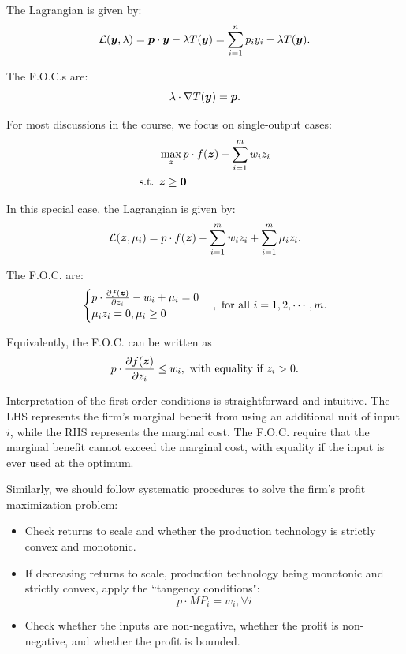 \noindent The Lagrangian is given by:
\[\mathcal L(\bm y,\lambda) = \bm p\cdot \bm y-\lambda T(\bm y) = \sum_{i = 1}^n p_iy_i-\lambda T(\bm y).\]

The F.O.C.s are:
\[\lambda\cdot  \nabla T(\bm y) = \bm p.\]

\noindent For most discussions in the course, we focus on single-output cases:
\[\begin{aligned}
& \max_{z} p\cdot f(\bm z)-\sum_{i = 1}^m w_iz_i\\
\text{s.t. }& \bm z\ge \textbf 0
\end{aligned}\]

In this special case, the Lagrangian is given by:
\[\mathcal L(\bm z,\mu_i) = p\cdot f(\bm z)-\sum_{i = 1}^m w_iz_i + \sum_{i = 1}^m \mu_iz_i.\]

The F.O.C. are:
\[\begin{cases}
p\cdot \frac{\partial f(\bm z)}{\partial z_i}-w_i+\mu_i = 0\\
\mu_i z_i = 0,\mu_i\ge 0
\end{cases},\text{ for all } i = 1,2,\cdots,m.\]

Equivalently, the F.O.C. can be written as
\[p\cdot \frac{\partial f(\bm z)}{\partial z_i}\le w_i, \text{ with equality if }
z_i>0.\]

Interpretation of the first-order conditions is straightforward and
intuitive. The LHS represents the firm's marginal
benefit from using an additional unit of input \(i\),
while the RHS represents the marginal cost. The F.O.C. require that the
marginal benefit cannot exceed the marginal cost, with equality if
the input is ever used at the optimum.

Similarly, we should follow systematic procedures to solve the firm's
profit maximization problem:
\begin{itemize}
\item
  Check {returns to
  scale} and whether the production technology is strictly convex and
  monotonic.
\item
  If decreasing returns to scale, production technology being monotonic and strictly convex, apply
  the ``tangency conditions":
  \[p\cdot MP_i = w_i, \forall i\]
\item
  Check whether the inputs are non-negative, whether the profit is
  non-negative, and whether the profit is bounded.
\end{itemize}


